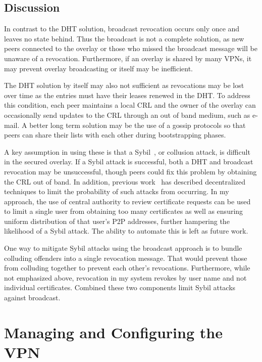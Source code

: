 \subsection{Discussion}

In contrast to the DHT solution, broadcast revocation occurs only once and
leaves no state behind.  Thus the broadcast is not a complete solution, as new
peers connected to the overlay or those who missed the broadcast message will
be unaware of a revocation.  Furthermore, if an overlay is shared by many VPNs,
it may prevent overlay broadcasting or itself may be inefficient.

The DHT solution by itself may also not sufficient as revocations may be lost
over time as the entries must have their leases renewed in the DHT.  To address
this condition, each peer maintains a local CRL and the owner of the overlay
can occasionally send updates to the CRL through an out of band medium, such as
e-mail.  A better long term solution may be the use of a gossip protocols so
that peers can share their lists with each other during bootstrapping phases.

A key assumption in using these is that a Sybil~\cite{Sybil}, or collusion
attack, is difficult in the secured overlay.	 If a Sybil attack is successful,
both a DHT and broadcast revocation may be unsuccessful, though peers could fix
this problem by obtaining the CRL out of band.  In addition, previous
work~\cite{secure_routing} has described decentralized techniques to limit the
probability of such attacks from occurring.  In my approach, the use of central
authority to review certificate requests can be used to limit a single user
from obtaining too many certificates as well as ensuring uniform distribution
of that user's P2P addresses, further hampering the likelihood of a Sybil
attack.  The ability to automate this is left as future work.

One way to mitigate Sybil attacks using the broadcast approach is to bundle
colluding offenders into a single revocation message.  That would prevent those
from colluding together to prevent each other's revocations.  Furthermore,
while not emphasized above, revocation in my system revokes by user name and
not individual certificates.  Combined these two components limit Sybil attacks
against broadcast.

\section{Managing and Configuring the VPN}
\label{vpn:groupvpn}

